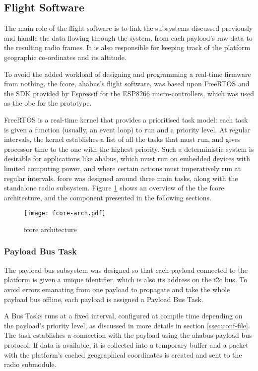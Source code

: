 \subsection{Flight Software}

The main role of the flight software is to link the subsystems discussed
previously and handle the data flowing through the system, from each payload's
raw data to the resulting radio frames. It is also responsible for keeping track
of the platform geographic co-ordinates and its altitude.

To avoid the added workload of designing and programming a real-time firmware
from nothing, the \acrfull{fcore}, \acrshort{ahabus}'s flight software, was
based upon FreeRTOS and the SDK provided by Espressif for the ESP8266
micro-controllers, which was used as the \acrshort{obc} for the prototype.

FreeRTOS is a real-time kernel that provides a prioritised task model: each task
is given a function (usually, an event loop) to run and a priority level. At
regular intervals, the kernel establishes a list of all the tasks that must run,
and gives processor time to the one with the highest priority. Such a
deterministic system is desirable for applications like \acrshort{ahabus}, which
must run on embedded devices with limited computing power, and where certain
actions must imperatively run at regular intervals. \acrshort{fcore} was
designed around three main tasks, along with the standalone radio subsystem.
Figure \ref{fig:fcore-arch} shows an overview of the the \acrshort{fcore}
architecture, and the component presented in the following sections.

\begin{figure}[H]
\texttt{[image: fcore-arch.pdf]}
\centering
\caption{\acrshort{fcore} architecture}
\label{fig:fcore-arch}
\end{figure}

\subsubsection{Payload Bus Task}

The payload bus subsystem was designed so that each payload connected to the
platform is given a unique identifier, which is also its address on the
\acrshort{i2c} bus. To avoid errors emanating from one payload to propagate
and take the whole payload bus offline, each payload is assigned a Payload
Bus Task.

A Bus Tasks runs at a fixed interval, configured at compile time depending on
the payload's priority level, as discussed in more details in section
\ref{ssec:conf-file}. The task establishes a connection with the payload using
the \acrshort{ahabus} payload bus protocol. If data is available, it is
collected into a temporary buffer and a packet with the platform's cached
geographical coordinates is created and sent to the radio submodule.

